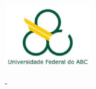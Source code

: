 \thispagestyle{empty}

\begin{center}
    \includegraphics[height=2.7cm, keepaspectratio=true]{figuras/logo-ufabc}

    \MakeUppercase{\imprimirinstituicao\space-\space\pInstituicaoSigla}

    \pCurso
\end{center}

\vfill

\begin{center}
    {\Large \bfseries \imprimirtitulo}
\end{center}

\vspace{6cm}

\begin{center}
    {\imprimirautor}
\end{center}

\vspace{0,5cm}

\begin{center}
    {\imprimirlocal}

    {\imprimirdata}
\end{center}
